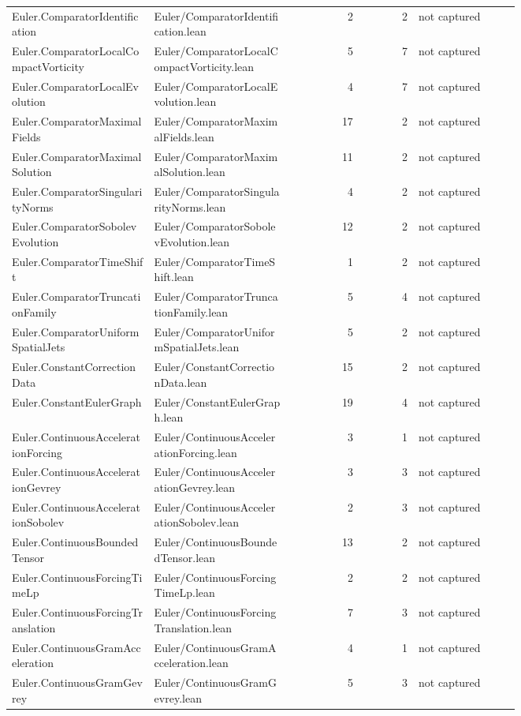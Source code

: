\documentclass[10pt]{article}
\begin{document}
\begin{longtable}{p{0.28\linewidth}p{0.27\linewidth}r r p{0.20\linewidth}}
Euler.ComparatorIdentification & Euler/ComparatorIdentification.lean & 2 & 2 & not captured\\
Euler.ComparatorLocalCompactVorticity & Euler/ComparatorLocalCompactVorticity.lean & 5 & 7 & not captured\\
Euler.ComparatorLocalEvolution & Euler/ComparatorLocalEvolution.lean & 4 & 7 & not captured\\
Euler.ComparatorMaximalFields & Euler/ComparatorMaximalFields.lean & 17 & 2 & not captured\\
Euler.ComparatorMaximalSolution & Euler/ComparatorMaximalSolution.lean & 11 & 2 & not captured\\
Euler.ComparatorSingularityNorms & Euler/ComparatorSingularityNorms.lean & 4 & 2 & not captured\\
Euler.ComparatorSobolevEvolution & Euler/ComparatorSobolevEvolution.lean & 12 & 2 & not captured\\
Euler.ComparatorTimeShift & Euler/ComparatorTimeShift.lean & 1 & 2 & not captured\\
Euler.ComparatorTruncationFamily & Euler/ComparatorTruncationFamily.lean & 5 & 4 & not captured\\
Euler.ComparatorUniformSpatialJets & Euler/ComparatorUniformSpatialJets.lean & 5 & 2 & not captured\\
Euler.ConstantCorrectionData & Euler/ConstantCorrectionData.lean & 15 & 2 & not captured\\
Euler.ConstantEulerGraph & Euler/ConstantEulerGraph.lean & 19 & 4 & not captured\\
Euler.ContinuousAccelerationForcing & Euler/ContinuousAccelerationForcing.lean & 3 & 1 & not captured\\
Euler.ContinuousAccelerationGevrey & Euler/ContinuousAccelerationGevrey.lean & 3 & 3 & not captured\\
Euler.ContinuousAccelerationSobolev & Euler/ContinuousAccelerationSobolev.lean & 2 & 3 & not captured\\
Euler.ContinuousBoundedTensor & Euler/ContinuousBoundedTensor.lean & 13 & 2 & not captured\\
Euler.ContinuousForcingTimeLp & Euler/ContinuousForcingTimeLp.lean & 2 & 2 & not captured\\
Euler.ContinuousForcingTranslation & Euler/ContinuousForcingTranslation.lean & 7 & 3 & not captured\\
Euler.ContinuousGramAcceleration & Euler/ContinuousGramAcceleration.lean & 4 & 1 & not captured\\
Euler.ContinuousGramGevrey & Euler/ContinuousGramGevrey.lean & 5 & 3 & not captured\\

\end{longtable}
\end{document}
